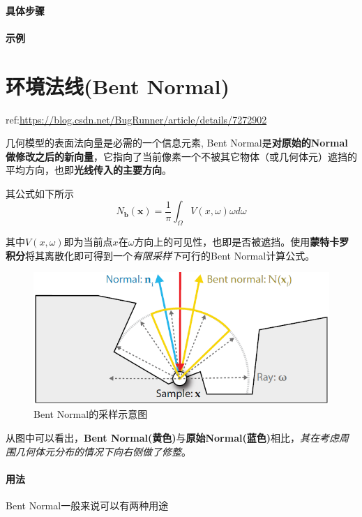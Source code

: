 \documentclass[UTF8,a4paper,12pt]{ctexbook}
\begin{document}
			
			\paragraph{具体步骤}
				
				
			
			\paragraph{示例}
				
			
			
			
			
	\section{环境法线(Bent Normal)}
		ref:\url{https://blog.csdn.net/BugRunner/article/details/7272902}
	
		几何模型的表面法向量是必需的一个信息元素, Bent Normal是\textbf{对原始的Normal做修改之后的新向量}，它指向了当前像素一个不被其它物体（或几何体元）遮挡的平均方向，也即\textbf{光线传入的主要方向}。
		
		其公式如下所示
		$$
		N_{\mathbf{b}}(\mathbf{x}) = \dfrac{1}{\pi} \int_{\Omega} V(x,\omega)\omega d\omega
		$$
		
		其中$V(x,\omega)$即为当前点$x$在$\omega$方向上的可见性，也即是否被遮挡。使用\textbf{蒙特卡罗积分}将其离散化即可得到一个\textit{有限采样下}可行的Bent Normal计算公式。
		
		\begin{figure}[H]
			\centering
			\includegraphics[width=.75\linewidth]{BentNormal}
			\caption{Bent Normal的采样示意图}
		\end{figure}
		
		从图中可以看出，\textbf{Bent Normal(黄色)}与\textbf{原始Normal(蓝色)}相比，\textit{其在考虑周围几何体元分布的情况下向右侧做了修整}。
		
		\paragraph{用法}Bent Normal一般来说可以有两种用途
		
\end{document}
